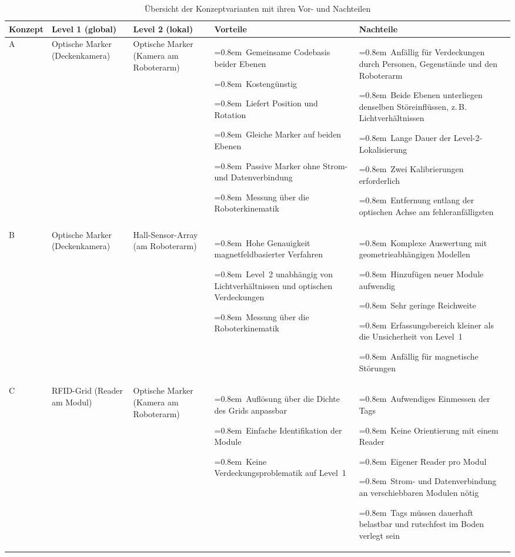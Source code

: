 \begin{table}[htbp]
    \centering
    \caption{Übersicht der Konzeptvarianten mit ihren Vor- und Nachteilen}
    \label{tab:hybridkonzepte}
    \footnotesize
    \renewcommand{\arraystretch}{1.3}
    \newcommand{\pkt}[1]{\par\noindent\hangindent=0.8em\hangafter=1\textbullet~#1}
    \begin{tabularx}{\textwidth}{>{\raggedright\arraybackslash}p{1.3cm}
                                 >{\raggedright\arraybackslash}p{1.9cm}
                                 >{\raggedright\arraybackslash}p{1.9cm}
                                 L L}
        \toprule
        \textbf{Konzept}
        & \textbf{Level 1 (global)}
        & \textbf{Level 2 (lokal)}
        & \textbf{Vorteile}
        & \textbf{Nachteile} \\
        \midrule
        A
        & Optische Marker (Deckenkamera)
        & Optische Marker (Kamera am Roboterarm)
        & \pkt{Gemeinsame Codebasis beider Ebenen}
          \pkt{Kostengünstig}
          \pkt{Liefert Position und Rotation}
          \pkt{Gleiche Marker auf beiden Ebenen}
          \pkt{Passive Marker ohne Strom- und Datenverbindung}
          \pkt{Messung über die Roboterkinematik}
        & \pkt{Anfällig für Verdeckungen durch Personen, Gegenstände und den Roboterarm}
          \pkt{Beide Ebenen unterliegen denselben Störeinflüssen, z.\,B. Lichtverhältnissen}
          \pkt{Lange Dauer der Level-2-Lokalisierung}
          \pkt{Zwei Kalibrierungen erforderlich}
          \pkt{Entfernung entlang der optischen Achse am fehleranfälligsten} \\
        \midrule
        B
        & Optische Marker (Deckenkamera)
        & Hall-Sensor-Array (am Roboterarm)
        & \pkt{Hohe Genauigkeit magnetfeldbasierter Verfahren}
          \pkt{Level~2 unabhängig von Lichtverhältnissen und optischen Verdeckungen}
          \pkt{Messung über die Roboterkinematik}
        & \pkt{Komplexe Auswertung mit geometrieabhängigen Modellen}
          \pkt{Hinzufügen neuer Module aufwendig}
          \pkt{Sehr geringe Reichweite}
          \pkt{Erfassungsbereich kleiner als die Unsicherheit von Level~1}
          \pkt{Anfällig für magnetische Störungen} \\
        \midrule
        C
        & RFID-Grid (Reader am Modul)
        & Optische Marker (Kamera am Roboterarm)
        & \pkt{Auflösung über die Dichte des Grids anpassbar}
          \pkt{Einfache Identifikation der Module}
          \pkt{Keine Verdeckungsproblematik auf Level~1}
        & \pkt{Aufwendiges Einmessen der Tags}
          \pkt{Keine Orientierung mit einem Reader}
          \pkt{Eigener Reader pro Modul}
          \pkt{Strom- und Datenverbindung an verschiebbaren Modulen nötig}
          \pkt{Tags müssen dauerhaft belastbar und rutschfest im Boden verlegt sein} \\
        \bottomrule
    \end{tabularx}
\end{table}

